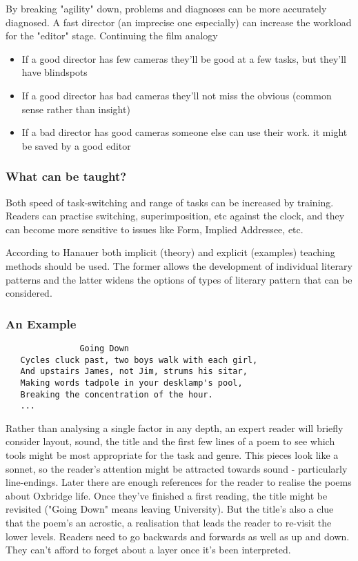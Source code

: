 \documentclass[11pt]{article}
\begin{document}
 By breaking "agility" down, problems and diagnoses can be more
  accurately diagnosed. A fast director (an imprecise one especially) can increase the workload for
  the "editor" stage. Continuing the film analogy
\begin{itemize}
\item If a good director has few cameras they'll be good at a few tasks,
but they'll have blindspots
\item If a good director has bad cameras they'll not miss the obvious (common sense
  rather than insight)
\item If a bad
director has good cameras someone else can use their work. it might be saved
by a good editor
\end{itemize}

\subsubsection*{What can be taught?}

Both speed of task-switching and range of tasks can be increased by
  training.  Readers can practise switching, superimposition, etc against the
  clock, and they can become more sensitive to issues like Form, Implied
  Addressee, etc.


According to Hanauer both implicit (theory) and explicit (examples) teaching methods
should be used. The former allows the development of individual literary
patterns and the latter widens the options of types of literary pattern
that can be considered.

\subsubsection*{An Example}
\begin{verbatim}
               Going Down
   Cycles cluck past, two boys walk with each girl,
   And upstairs James, not Jim, strums his sitar,
   Making words tadpole in your desklamp's pool,
   Breaking the concentration of the hour.
   ...
\end{verbatim}

Rather than analysing a single factor in any depth, an expert reader will
  briefly
consider layout, sound, the title and the first few lines of a poem to see
  which
tools might be most appropriate for the task and genre. This pieces look like a sonnet,
  so the reader's attention might be attracted towards sound - particularly  line-endings.
Later there
  are enough references for the reader to realise the poems about Oxbridge
  life. Once they've finished a first reading, the title might be revisited ("Going
Down" means leaving University). But the title's also a clue that the
poem's an acrostic, a realisation that leads the reader to re-visit the lower
  levels. 
Readers need to go backwards and forwards as well as up and down. They can't
afford to forget about a layer once it's been interpreted.
\end{document}
